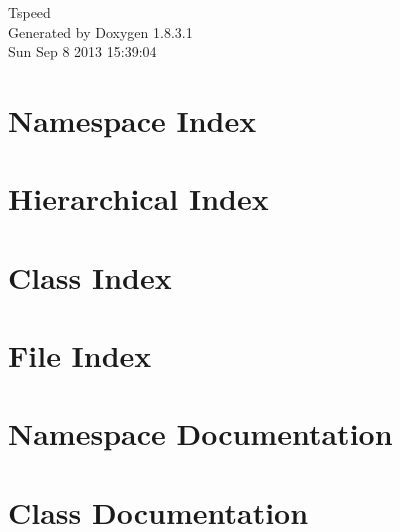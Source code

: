 \documentclass{book}
\begin{document}
\hypersetup{pageanchor=false,citecolor=blue}
\begin{titlepage}
\vspace*{7cm}
\begin{center}
{\Large Tspeed }\\
\vspace*{1cm}
{\large Generated by Doxygen 1.8.3.1}\\
\vspace*{0.5cm}
{\small Sun Sep 8 2013 15:39:04}\\
\end{center}
\end{titlepage}
\clearemptydoublepage
{}
\tableofcontents
\clearemptydoublepage
{}
\hypersetup{pageanchor=true,citecolor=blue}
\chapter{Namespace Index}

\chapter{Hierarchical Index}

\chapter{Class Index}

\chapter{File Index}

\chapter{Namespace Documentation}


\chapter{Class Documentation}
























\end{document}
